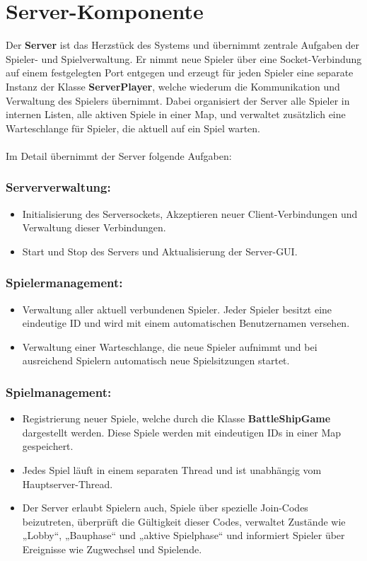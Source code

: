 \documentclass[12pt]{article}
\begin{document}
\section*{Server-Komponente}

Der \textbf{Server} ist das Herzstück des Systems und übernimmt zentrale Aufgaben der Spieler- und Spielverwaltung. Er nimmt neue Spieler über eine Socket-Verbindung auf einem festgelegten Port entgegen und erzeugt für jeden Spieler eine separate Instanz der Klasse \textbf{ServerPlayer}, welche wiederum die Kommunikation und Verwaltung des Spielers übernimmt. Dabei organisiert der Server alle Spieler in internen Listen, alle aktiven Spiele in einer Map, und verwaltet zusätzlich eine Warteschlange für Spieler, die aktuell auf ein Spiel warten.
\\ \\
Im Detail übernimmt der Server folgende Aufgaben:

\subsubsection*{Serververwaltung:}
\begin{itemize}
    \item Initialisierung des Serversockets, Akzeptieren neuer Client-Verbindungen und Verwaltung dieser Verbindungen.
    \item Start und Stop des Servers und Aktualisierung der Server-GUI.
\end{itemize}

\subsubsection*{Spielermanagement:}
\begin{itemize}
    \item Verwaltung aller aktuell verbundenen Spieler. Jeder Spieler besitzt eine eindeutige ID und wird mit einem automatischen Benutzernamen versehen.
    \item Verwaltung einer Warteschlange, die neue Spieler aufnimmt und bei ausreichend Spielern automatisch neue Spielsitzungen startet.
\end{itemize}

\subsubsection*{Spielmanagement:}
\begin{itemize}
    \item Registrierung neuer Spiele, welche durch die Klasse \textbf{BattleShipGame} dargestellt werden. Diese Spiele werden mit eindeutigen IDs in einer Map gespeichert.
    \item Jedes Spiel läuft in einem separaten Thread und ist unabhängig vom Hauptserver-Thread. 
    \item Der Server erlaubt Spielern auch, Spiele über spezielle Join-Codes beizutreten, überprüft die Gültigkeit dieser Codes, verwaltet Zustände wie „Lobby“, „Bauphase“ und „aktive Spielphase“ und informiert Spieler über Ereignisse wie Zugwechsel und Spielende.
\end{itemize}
\end{document}
